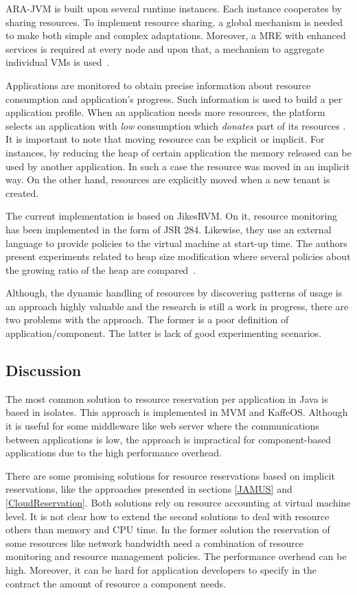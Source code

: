 ARA-JVM is built upon several runtime instances.
Each instance cooperates by sharing resources.
To implement resource sharing, a global mechanism is needed to make both simple and complex adaptations.
Moreover, a MRE with enhanced services is required at every node and upon that, a mechanism to aggregate individual VMs is used~\cite{Simao:2012:VEJ:2310096.2310158}.

Applications are monitored to obtain precise information about resource consumption and application's progress.
Such information is used to build a per application profile.
When an application needs more resources, the platform selects an application with \textit{low} consumption which \textit{donates} part of its resources \cite{Simao:2012:VEJ:2310096.2310158}.
It is important to note that moving resource can be explicit or implicit.
For instances, by reducing the heap of certain application the memory released can be used by another application.
In such a case the resource was moved in an implicit way.
On the other hand, resources are explicitly moved when a new tenant is created.

The current implementation is based on JikesRVM.
On it, resource monitoring has been implemented in the form of JSR 284.
Likewise, they use an external language to provide policies to the virtual machine at start-up time.
The authors present experiments related to heap size modification where several policies about the growing ratio of the heap are compared~\cite{Simao:2012:VEJ:2310096.2310158}.

Although, the dynamic handling of resources by discovering patterns of usage is an approach highly valuable and the research is still a work in progress, there are two problems with the approach.
The former is a poor definition of application/component.
The latter is lack of good experimenting scenarios.


\subsection{Discussion}

The most common solution to resource reservation per application in Java is based in isolates. This approach is implemented in MVM and KaffeOS. Although it is useful for some middleware like web server where the communications between applications is low, the approach is impractical for component-based applications due to the high performance overhead.

There are some promising solutions for resource reservations based on implicit reservations, like the approaches presented in sections \ref{JAMUS} and \ref{CloudReservation}. Both solutions rely on resource accounting at virtual machine level. It is not clear how to extend the second solutions to deal with resource others than memory and CPU time. In the former solution the reservation of some resources like network bandwidth need a combination of resource monitoring and resource management policies. The performance overhead can be high. Moreover, it can be hard for application developers to specify in the contract the amount of resource a component needs.

